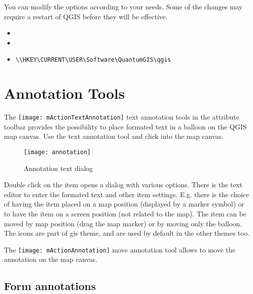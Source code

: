 You can modify the options according to your needs. Some of the changes may
require a restart of QGIS before they will be effective.

\begin{itemize}
\item {}
\item {}
\item {}
\begin{verbatim}
\\HKEY\CURRENT\USER\Software\QuantumGIS\qgis
\end{verbatim}
\end{itemize}

\section{Annotation Tools}\label{sec:annotations}

The \texttt{[image: mActionTextAnnotation]} text
annotation tools in the attribute toolbar provides the possibility to
place formated text in a balloon on the QGIS map canvas. Use the text
annotation tool and click into the map canvas.

\begin{figure}[ht]
   \centering
   \texttt{[image: annotation]}
   \caption{Annotation text dialog \nixcaption}
   \label{fig:annotation}
\end{figure}

Double click on the item opens a dialog with various options. There is the
text editor to enter the formated text and other item settings. E.g. there
is the choice of having the item placed on a map position (displayed by
a marker symbol) or to have the item on a screen position (not related
to the map). The item can be moved by map position (drag the map marker)
or by moving only the balloon. The icons are part of gis theme, and are used
by default in the other themes too.

The \texttt{[image: mActionAnnotation]} move annotation
tool allows to move the annotation on the map canvas.

\subsection{Form annotations}

